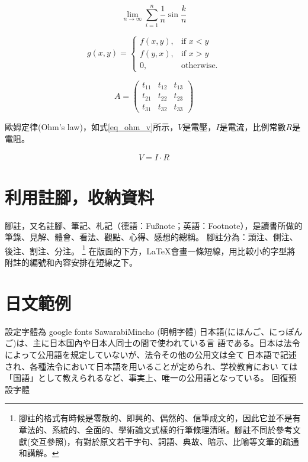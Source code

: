 \begin{equation}
\lim_{n \to \infty}\sum_{i=1}^n{\frac{1}{n}}\sin\frac{k}{n}
\end{equation}

\begin{equation}
   g(x,y) = \left\{\begin{array}{ll}
      f(x,y), & \mbox{if $x<y$} \\  %
      f(y,x), & \mbox{if $x>y$} \\  %
      0,      & \mbox{otherwise.}
     \end{array} \right.
\end{equation}

\begin{equation}
   A =\begin{pmatrix}                %
  t_{11} & t_{12} & t_{13} \\
  t_{21} & t_{22} & t_{23} \\
  t_{31} & t_{32} & t_{33}
   \end{pmatrix}
\end{equation}
\vspace*{3em}

歐姆定律(Ohm's law)，如式\ref{eq_ohm_v}所示，$V$是電壓，$I$是電流，比例常數$R$是電阻。

\begin{equation}\label{eq_ohm_v}
    \begin{split}
        V = I \cdot R
    \end{split}
\end{equation}
\clearpage

\section{利用註腳，收納資料}
腳註，又名註腳、筆記、札記（德語：Fußnote；英語：Footnote），是讀書所做的筆錄、見解、體會、看法、觀點、心得、感想的總稱。
腳註分為：頭注、側注、後注、割注、分注。
\footnote{腳註的格式有時候是零散的、即興的、偶然的、信筆成文的，因此它並不是有章法的、系統的、全面的、學術論文式樣的行筆條理清晰。腳註不同於參考文獻(交互參照)，有對於原文若干字句、詞語、典故、暗示、比喻等文筆的疏通和講解。}
在版面的下方，\LaTeX 會畫一條短線，用比較小的字型將附註的編號和內容安排在短線之下。

\section{日文範例}
設定字體為 google fonts SawarabiMincho (明朝字體) \newline
\mincho
日本語(にほんご、にっぽんご)は、主に日本国內や日本人同士の間で使われている言
語である。日本は法令によって公用語を規定していないが、法令その他の公用文は全て
日本語で記述され、各種法令において日本語を用いることが定められ、学校教育におい
ては「国語」として教えられるなど、事実上、唯一の公用語となっている。
\ukai
\rmfamily
\newline
回復預設字體

